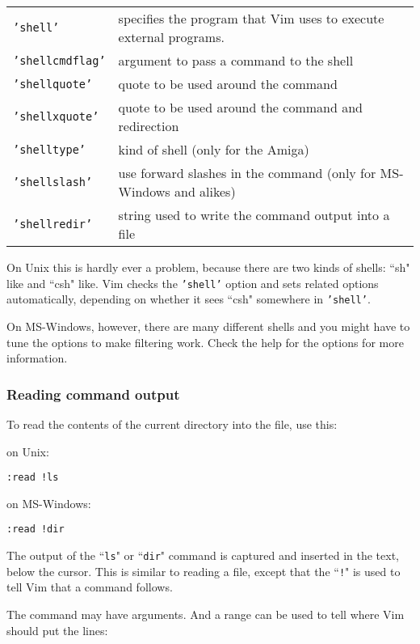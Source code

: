 \begin{center}\begin{tabular}{l l}
				\texttt{'shell'} & specifies the program that Vim uses to execute external programs. \\
				\texttt{'shellcmdflag'} & argument to pass a command to the shell \\
				\texttt{'shellquote'} & quote to be used around the command \\
				\texttt{'shellxquote'} & quote to be used around the command and redirection \\
				\texttt{'shelltype'} & kind of shell (only for the Amiga) \\
				\texttt{'shellslash'} & use forward slashes in the command (only for MS-Windows and alikes) \\
				\texttt{'shellredir'} & string used to write the command output into a file \\
\end{tabular}\end{center}

On Unix this is hardly ever a problem, because there are two kinds of shells: ``sh" like and ``csh" like.
Vim checks the \texttt{'shell'} option and sets related options automatically, depending on whether it sees ``csh" somewhere in \texttt{'shell'}.

On MS-Windows, however, there are many different shells and you might have to tune the options to make filtering work.
Check the help for the options for more information.
\subsubsection{Reading command output}
To read the contents of the current directory into the file, use this:

on Unix:
\begin{Verbatim}[samepage=true]
 :read !ls
\end{Verbatim}
on MS-Windows:
\begin{Verbatim}[samepage=true]
 :read !dir
\end{Verbatim}

The output of the ``\texttt{ls}" or ``\texttt{dir}" command is captured and inserted in the text, below the cursor.
This is similar to reading a file, except that the ``\texttt{!}" is used to tell Vim that a command follows.

The command may have arguments.
And a range can be used to tell where Vim should put the lines:

